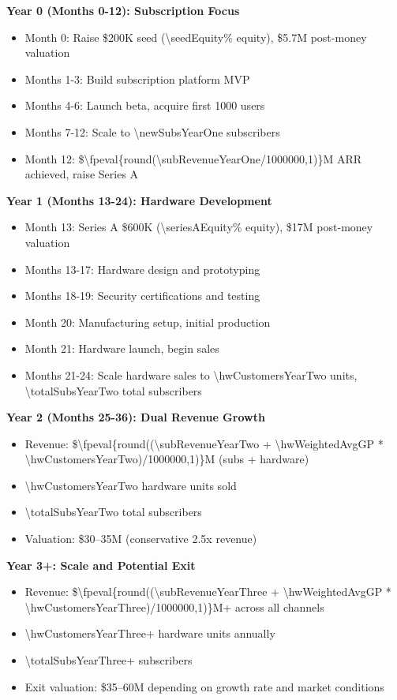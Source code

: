 \documentclass[11pt]{article}
\newcommand{\numfpeval}[1]{\num{\fpeval{#1}}}
\begin{document}
\textbf{Year 0 (Months 0-12): Subscription Focus}
\begin{itemize}
  \item Month 0: Raise \$\num{200}K seed (\num{\seedEquity}\% equity), \$\num{5.7}M post-money valuation
  \item Months 1-3: Build subscription platform MVP
  \item Months 4-6: Launch beta, acquire first \num{1000} users
  \item Months 7-12: Scale to \num{\newSubsYearOne} subscribers
  \item Month 12: \$\numfpeval{round(\subRevenueYearOne/1000000,1)}M ARR achieved, raise Series A
\end{itemize}

\textbf{Year 1 (Months 13-24): Hardware Development}
\begin{itemize}
  \item Month 13: Series A \$\num{600}K (\num{\seriesAEquity}\% equity), \$\num{17}M post-money valuation
  \item Months 13-17: Hardware design and prototyping
  \item Months 18-19: Security certifications and testing
  \item Month 20: Manufacturing setup, initial production
  \item Month 21: Hardware launch, begin sales
  \item Months 21-24: Scale hardware sales to \num{\hwCustomersYearTwo} units, \num{\totalSubsYearTwo} total subscribers
\end{itemize}

\textbf{Year 2 (Months 25-36): Dual Revenue Growth}
\begin{itemize}
  \item Revenue: \$\numfpeval{round((\subRevenueYearTwo + \hwWeightedAvgGP * \hwCustomersYearTwo)/1000000,1)}M (subs + hardware)
  \item \num{\hwCustomersYearTwo} hardware units sold
  \item \num{\totalSubsYearTwo} total subscribers
  \item Valuation: \$\num{30}--\num{35}M (conservative \num{2.5}x revenue)
\end{itemize}

\textbf{Year 3+: Scale and Potential Exit}
\begin{itemize}
  \item Revenue: \$\numfpeval{round((\subRevenueYearThree + \hwWeightedAvgGP * \hwCustomersYearThree)/1000000,1)}M+ across all channels
  \item \num{\hwCustomersYearThree}+ hardware units annually
  \item \num{\totalSubsYearThree}+ subscribers
  \item Exit valuation: \$\num{35}--\num{60}M depending on growth rate and market conditions
\end{itemize}
\end{document}
